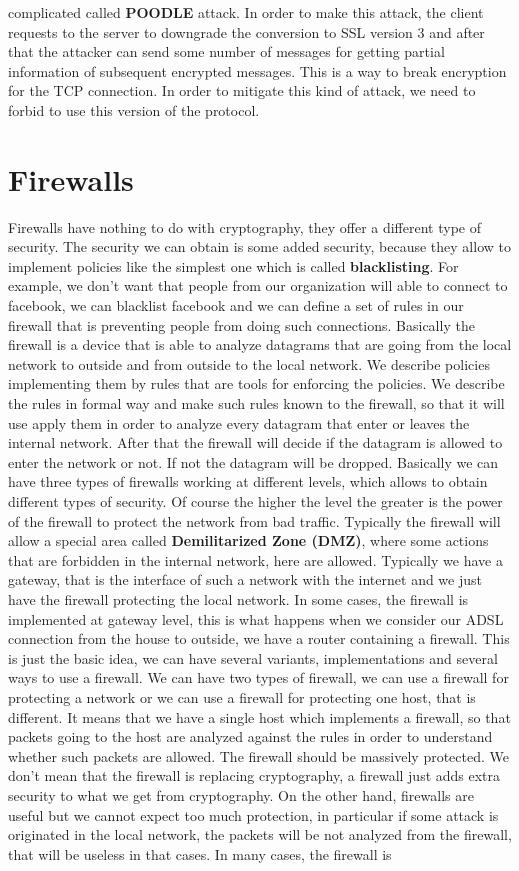 \documentclass[11pt]{article}
\begin{document}
complicated called \textbf{POODLE} attack. In order to make this attack, the client requests to the server to downgrade the conversion to SSL version 3 and after that the attacker can send some number of messages for getting partial information of subsequent encrypted messages. This is a way to break encryption for the TCP connection. In order to mitigate this kind of attack, we need to forbid to use this version of the protocol.
\section{Firewalls}
Firewalls have nothing to do with cryptography, they offer a different type of security. The security we can obtain is some added security, because they allow to implement policies like the simplest one which is called \textbf{blacklisting}. For example, we don't want that people from our organization will able to connect to facebook, we can blacklist facebook and we can define a set of rules in our firewall that is preventing people from doing such connections. Basically the firewall is a device that is able to analyze datagrams that are going from the local network to outside and from outside to the local network. We describe policies implementing them by rules that are tools for enforcing the policies. We describe the rules in formal way and make such rules known to the firewall, so that it will use apply them in order to analyze every datagram that enter or leaves the internal network. After that the firewall will decide if the datagram is allowed to enter the network or not. If not the datagram will be dropped. Basically we can have three types of firewalls working at different levels, which allows to obtain different types of security. Of course the higher the level the greater is the power of the firewall to protect the network from bad traffic. Typically the firewall will allow a special area called \textbf{Demilitarized Zone (DMZ)}, where some actions that are forbidden in the internal network, here are allowed. Typically we have a gateway, that is the interface of such a network with the internet and we just have the firewall protecting the local network. In some cases, the firewall is implemented at gateway level, this is what happens when we consider our ADSL connection from the house to outside, we have a router containing a firewall. This is just the basic idea, we can have several variants, implementations and several ways to use a firewall. We can have two types of firewall, we can use a firewall for protecting a network or we can use a firewall for protecting one host, that is different. It means that we have a single host which implements a firewall, so that packets going to the host are analyzed against the rules in order to understand whether such packets are allowed. The firewall should be massively protected. We don't mean that the firewall is replacing cryptography, a firewall just adds extra security to what we get from cryptography. On the other hand, firewalls are useful but we cannot expect too much protection, in particular if some attack is originated in the local network, the packets will be not analyzed from the firewall, that will be useless in that cases. In many cases, the firewall is 
\end{document}
